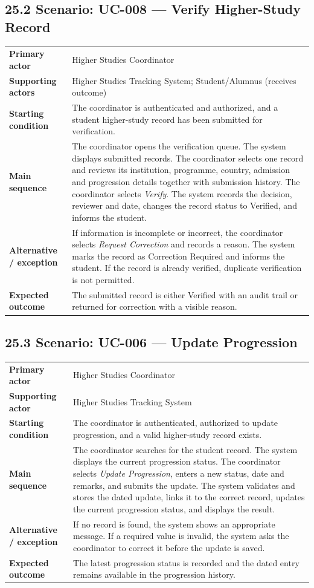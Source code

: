 \documentclass[12pt,a4paper]{article}
\begin{document}
\subsection*{25.2 Scenario: UC-008 --- Verify Higher-Study Record}
\begin{tabularx}{\textwidth}{>{\bfseries}p{3.2cm} X}
Primary actor & Higher Studies Coordinator\\
Supporting actors & Higher Studies Tracking System; Student/Alumnus (receives outcome)\\
Starting condition & The coordinator is authenticated and authorized, and a student higher-study record has been submitted for verification.\\
Main sequence & The coordinator opens the verification queue. The system displays submitted records. The coordinator selects one record and reviews its institution, programme, country, admission and progression details together with submission history. The coordinator selects \emph{Verify}. The system records the decision, reviewer and date, changes the record status to Verified, and informs the student.\\
Alternative / exception & If information is incomplete or incorrect, the coordinator selects \emph{Request Correction} and records a reason. The system marks the record as Correction Required and informs the student. If the record is already verified, duplicate verification is not permitted.\\
Expected outcome & The submitted record is either Verified with an audit trail or returned for correction with a visible reason.\\
\end{tabularx}

\subsection*{25.3 Scenario: UC-006 --- Update Progression}
\begin{tabularx}{\textwidth}{>{\bfseries}p{3.2cm} X}
Primary actor & Higher Studies Coordinator\\
Supporting actor & Higher Studies Tracking System\\
Starting condition & The coordinator is authenticated, authorized to update progression, and a valid higher-study record exists.\\
Main sequence & The coordinator searches for the student record. The system displays the current progression status. The coordinator selects \emph{Update Progression}, enters a new status, date and remarks, and submits the update. The system validates and stores the dated update, links it to the correct record, updates the current progression status, and displays the result.\\
Alternative / exception & If no record is found, the system shows an appropriate message. If a required value is invalid, the system asks the coordinator to correct it before the update is saved.\\
Expected outcome & The latest progression status is recorded and the dated entry remains available in the progression history.\\
\end{tabularx}
\end{document}
